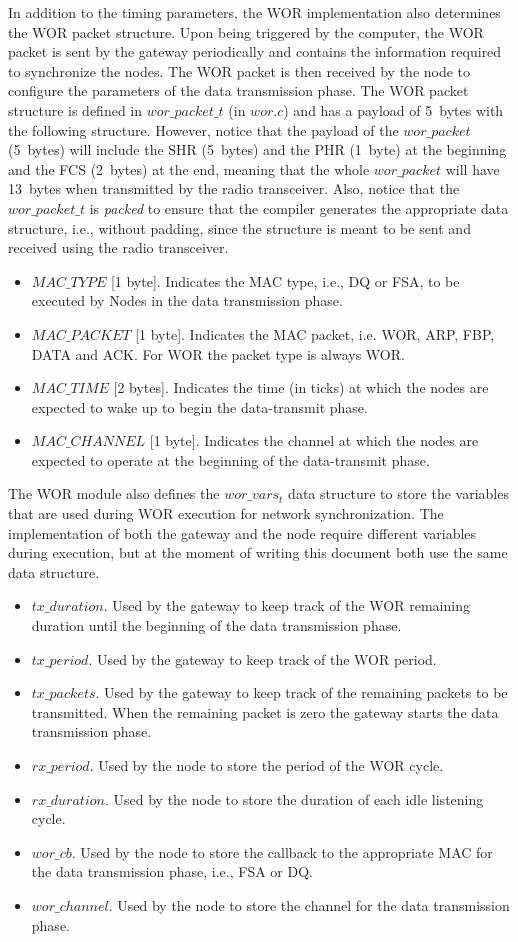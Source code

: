 In addition to the timing parameters, the WOR implementation also determines the WOR packet structure. Upon being triggered by the computer, the WOR packet is sent by the gateway periodically and contains the information required to synchronize the nodes. The WOR packet is then received by the node to configure the parameters of the data transmission phase. The WOR packet structure is defined in $wor\_packet\_t$ (in $wor.c$) and has a payload of 5~bytes with the following structure. However, notice that the payload of the $wor\_packet$ (5~bytes) will include the SHR (5~bytes) and the PHR (1~byte) at the beginning and the FCS (2~bytes) at the end, meaning that the whole $wor\_packet$ will have 13~bytes when transmitted by the radio transceiver. Also, notice that the $wor\_packet\_t$ is \textit{packed} to ensure that the compiler generates the appropriate data structure, i.e., without padding, since the structure is meant to be sent and received using the radio transceiver.
\begin{itemize}
\item $MAC\_TYPE$ [1 byte]. Indicates the MAC type, i.e., DQ or FSA, to be executed by Nodes in the data transmission phase.
\item $MAC\_PACKET$ [1 byte]. Indicates the MAC packet, i.e. WOR, ARP, FBP, DATA and ACK. For WOR the packet type is always WOR.
\item $MAC\_TIME$ [2 bytes]. Indicates the time (in ticks) at which the nodes are expected to wake up to begin the data-transmit phase.
\item $MAC\_CHANNEL$ [1 byte]. Indicates the channel at which the nodes are expected to operate at the beginning of the data-transmit phase.
\end{itemize}

The WOR module also defines the $wor\_vars_t$ data structure to store the variables that are used during WOR execution for network synchronization. The implementation of both the gateway and the node require different variables during execution, but at the moment of writing this document both use the same data structure.
\begin{itemize}
\item $tx\_duration$. Used by the gateway to keep track of the WOR remaining duration until the beginning of the data transmission phase.
\item $tx\_period$. Used by the gateway to keep track of the WOR period.
\item $tx\_packets$. Used by the gateway to keep track of the remaining packets to be transmitted. When the remaining packet is zero the gateway starts the data transmission phase.
\item $rx\_period$. Used by the node to store the period of the WOR cycle.
\item $rx\_duration$. Used by the node to store the duration of each idle listening cycle.
\item $wor\_cb$. Used by the node to store the callback to the appropriate MAC for the data transmission phase, i.e., FSA or DQ.
\item $wor\_channel$. Used by the node to store the channel for the data transmission phase.
\end{itemize}

